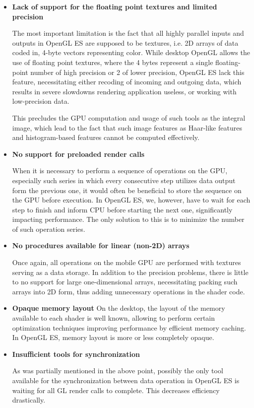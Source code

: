 \begin {itemize}
\item {\bf Lack of support for the floating point textures and limited precision}

The most important limitation is the fact that all highly parallel inputs and outputs in OpenGL ES are supposed to be textures, i.e. 2D arrays of data coded in, 4-byte vectors representing color. While desktop OpenGL allows the use of floating point textures, where the 4 bytes represent a single floating-point number of high precision or 2 of lower precision, OpenGL ES lack this feature, necessitating either recoding of incoming and outgoing data, which results in severe slowdowns rendering application useless, or working with low-precision data.

This precludes the GPU computation and usage of such tools as the integral image, which lead to the fact that such image features as Haar-like features and histogram-based features cannot be computed effectively. 
\item {\bf No support for preloaded render calls}

When it is necessary to perform a sequence of operations on the GPU, especially such series in which every consecutive step utilizes data output form the previous one, it would often be beneficial to store the sequence on the GPU before execution. In OpenGL ES, we, however, have to wait for each step to finish and inform CPU before starting the next one, significantly impacting performance. The only solution to this is to minimize the number of such operation series. 

\item {\bf No procedures available for linear (non-2D) arrays}

Once again, all operations on the mobile GPU are performed with textures serving as a data storage. In addition to the precision problems, there is little to no support for large one-dimensional arrays, necessitating packing such arrays into 2D form, thus adding unnecessary operations in the shader code. 
\item {\bf Opaque memory layout}
On the desktop, the layout of the memory available to each shader is well known, allowing to perform certain optimization techniques improving performance by efficient memory caching. In OpenGL ES, memory layout is more or less completely opaque. 

\item {\bf Insufficient tools for synchronization}

As was partially mentioned in the above point, possibly the only tool available for the synchronization between data operation in OpenGL ES is waiting for all GL render calls to complete. This decreases efficiency drastically. 
\end{itemize}

